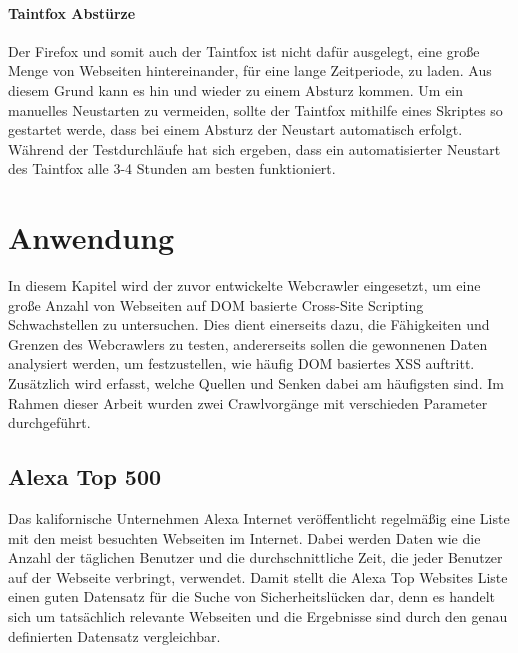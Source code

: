 \subsubsection{Taintfox Abstürze}
Der Firefox und somit auch der Taintfox ist nicht dafür ausgelegt, eine große Menge von Webseiten hintereinander, für eine lange Zeitperiode, zu laden. Aus diesem Grund kann es hin und wieder zu einem Absturz kommen. Um ein manuelles Neustarten zu vermeiden, sollte der Taintfox mithilfe eines Skriptes so gestartet werde, dass bei einem Absturz der Neustart automatisch erfolgt. Während der Testdurchläufe hat sich ergeben, dass ein automatisierter Neustart des Taintfox alle 3-4 Stunden am besten funktioniert.

\chapter{Anwendung}
In diesem Kapitel wird der zuvor entwickelte Webcrawler eingesetzt, um eine große Anzahl von Webseiten auf DOM basierte Cross-Site Scripting Schwachstellen zu untersuchen. Dies dient einerseits dazu, die Fähigkeiten und Grenzen des Webcrawlers zu testen, andererseits sollen die gewonnenen Daten analysiert werden, um festzustellen, wie häufig DOM basiertes XSS auftritt. Zusätzlich wird erfasst, welche Quellen und Senken dabei am häufigsten sind. Im Rahmen dieser Arbeit wurden zwei Crawlvorgänge mit verschieden Parameter durchgeführt.
\section{Alexa Top 500}
\label{sec:Alexa500}
Das kalifornische Unternehmen Alexa Internet veröffentlicht regelmäßig eine Liste mit den meist besuchten Webseiten im Internet.\cite{AlexaTop500} Dabei werden Daten wie die Anzahl der täglichen Benutzer und die durchschnittliche Zeit, die jeder Benutzer auf der Webseite verbringt, verwendet. Damit stellt die Alexa Top Websites Liste einen guten Datensatz für die Suche von Sicherheitslücken dar, denn es handelt sich um tatsächlich relevante Webseiten und die Ergebnisse sind durch den genau definierten Datensatz vergleichbar.\\
